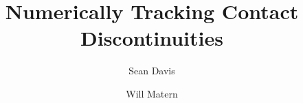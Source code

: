 \documentclass{article}
\begin{document}
\title{Numerically Tracking Contact Discontinuities}
\author{Sean Davis \and Will Matern}
\maketitle















\end{document}
